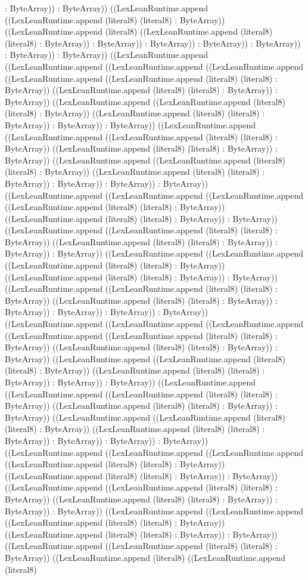 \documentclass[11pt]{article}
\begin{document}
: ByteArray)) : ByteArray)) ((LexLeanRuntime.append ((LexLeanRuntime.append (literal8) (literal8) : ByteArray)) ((LexLeanRuntime.append (literal8) ((LexLeanRuntime.append (literal8) (literal8) : ByteArray)) : ByteArray)) : ByteArray)) : ByteArray)) : ByteArray)) : ByteArray)) : ByteArray)) ((LexLeanRuntime.append ((LexLeanRuntime.append ((LexLeanRuntime.append ((LexLeanRuntime.append ((LexLeanRuntime.append ((LexLeanRuntime.append (literal8) (literal8) : ByteArray)) ((LexLeanRuntime.append (literal8) (literal8) : ByteArray)) : ByteArray)) ((LexLeanRuntime.append ((LexLeanRuntime.append (literal8) (literal8) : ByteArray)) ((LexLeanRuntime.append (literal8) (literal8) : ByteArray)) : ByteArray)) : ByteArray)) ((LexLeanRuntime.append ((LexLeanRuntime.append ((LexLeanRuntime.append (literal8) (literal8) : ByteArray)) ((LexLeanRuntime.append (literal8) (literal8) : ByteArray)) : ByteArray)) ((LexLeanRuntime.append ((LexLeanRuntime.append (literal8) (literal8) : ByteArray)) ((LexLeanRuntime.append (literal8) (literal8) : ByteArray)) : ByteArray)) : ByteArray)) : ByteArray)) ((LexLeanRuntime.append ((LexLeanRuntime.append ((LexLeanRuntime.append ((LexLeanRuntime.append (literal8) (literal8) : ByteArray)) ((LexLeanRuntime.append (literal8) (literal8) : ByteArray)) : ByteArray)) ((LexLeanRuntime.append ((LexLeanRuntime.append (literal8) (literal8) : ByteArray)) ((LexLeanRuntime.append (literal8) (literal8) : ByteArray)) : ByteArray)) : ByteArray)) ((LexLeanRuntime.append ((LexLeanRuntime.append ((LexLeanRuntime.append (literal8) (literal8) : ByteArray)) ((LexLeanRuntime.append (literal8) (literal8) : ByteArray)) : ByteArray)) ((LexLeanRuntime.append ((LexLeanRuntime.append (literal8) (literal8) : ByteArray)) ((LexLeanRuntime.append (literal8) (literal8) : ByteArray)) : ByteArray)) : ByteArray)) : ByteArray)) : ByteArray)) ((LexLeanRuntime.append ((LexLeanRuntime.append ((LexLeanRuntime.append ((LexLeanRuntime.append ((LexLeanRuntime.append (literal8) (literal8) : ByteArray)) ((LexLeanRuntime.append (literal8) (literal8) : ByteArray)) : ByteArray)) ((LexLeanRuntime.append ((LexLeanRuntime.append (literal8) (literal8) : ByteArray)) ((LexLeanRuntime.append (literal8) (literal8) : ByteArray)) : ByteArray)) : ByteArray)) ((LexLeanRuntime.append ((LexLeanRuntime.append ((LexLeanRuntime.append (literal8) (literal8) : ByteArray)) ((LexLeanRuntime.append (literal8) (literal8) : ByteArray)) : ByteArray)) ((LexLeanRuntime.append ((LexLeanRuntime.append (literal8) (literal8) : ByteArray)) ((LexLeanRuntime.append (literal8) (literal8) : ByteArray)) : ByteArray)) : ByteArray)) : ByteArray)) ((LexLeanRuntime.append ((LexLeanRuntime.append ((LexLeanRuntime.append ((LexLeanRuntime.append (literal8) (literal8) : ByteArray)) ((LexLeanRuntime.append (literal8) (literal8) : ByteArray)) : ByteArray)) ((LexLeanRuntime.append ((LexLeanRuntime.append (literal8) (literal8) : ByteArray)) ((LexLeanRuntime.append (literal8) (literal8) : ByteArray)) : ByteArray)) : ByteArray)) ((LexLeanRuntime.append ((LexLeanRuntime.append ((LexLeanRuntime.append (literal8) (literal8) : ByteArray)) ((LexLeanRuntime.append (literal8) (literal8) : ByteArray)) : ByteArray)) ((LexLeanRuntime.append ((LexLeanRuntime.append (literal8) (literal8) : ByteArray)) ((LexLeanRuntime.append (literal8) ((LexLeanRuntime.append (literal8) 
\end{document}
